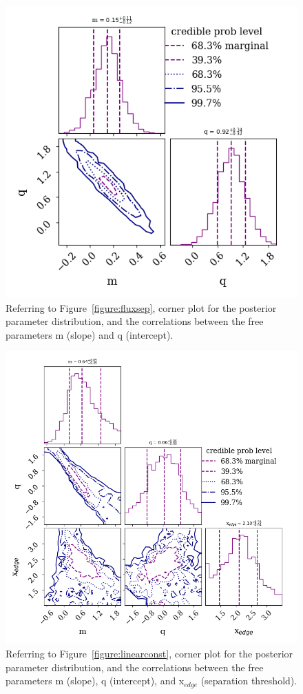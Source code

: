 \documentclass{aa}
\begin{document}
\begin{appendix}
\begin{figure}[hbt!]
\centering
   \includegraphics[width=\columnwidth]{Cornerplot_linear.png}
    \caption{Referring to Figure~\ref{figure:fluxsep}, corner plot for the posterior parameter distribution, and the correlations between the free parameters m (slope) and q (intercept).}
\end{figure}

\begin{figure}[hbt!]
\centering
   \includegraphics[width=\columnwidth]{Cornerplot_linearconst.png}
     \caption{Referring to Figure~\ref{figure:linearconst}, corner plot for the posterior parameter distribution, and the correlations between the free parameters m (slope), q (intercept), and x$_{edge}$ (separation threshold).}
\end{figure}


\end{appendix}
\end{document}
